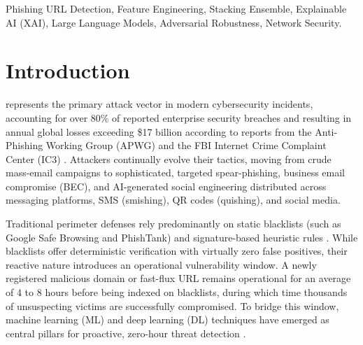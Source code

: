\documentclass[journal]{IEEEtran}
\begin{document}
\begin{abstract}
Experimental evaluation across large-scale benchmarks---including the primary 11,055-sample benchmark corpus and an independent, disjoint cross-dataset benchmark of 64,281 active phishing URLs from PhishTank---demonstrates that PhishGuard-XAI achieves a cross-validated \textbf{accuracy of 96.51\% $\pm$ 0.18\%}, an \textbf{$F_1$-score of 96.88\% $\pm$ 0.15\%}, and an \textbf{ROC-AUC of 0.9954 $\pm$ 0.001} using its Top-30 feature tier, outperforming the full 50-feature baseline while cutting inference latency by 25\%. Furthermore, McNemar's non-parametric test ($\chi^2 = 114.28, p < 0.0001$) and paired two-tailed $t$-tests ($p = 0.0004$) confirm that the performance gains over classical standalone models are statistically significant. Under rigorous adversarial stress testing (involving Cyrillic homoglyph substitution, leetspeak, subdomain padding, and Base64 parameter injection), the framework sustains an $F_1$-score above 97.4\%, confirming its practical viability for perimeter firewalls, email security gateways, and real-time browser extensions.
\end{abstract}

\begin{IEEEkeywords}
Phishing URL Detection, Feature Engineering, Stacking Ensemble, Explainable AI (XAI), Large Language Models, Adversarial Robustness, Network Security.
\end{IEEEkeywords}

\section{Introduction}
 represents the primary attack vector in modern cybersecurity incidents, accounting for over 80\% of reported enterprise security breaches and resulting in annual global losses exceeding \$17 billion according to reports from the Anti-Phishing Working Group (APWG) and the FBI Internet Crime Complaint Center (IC3) \cite{apwg2025, fbi2025}. Attackers continually evolve their tactics, moving from crude mass-email campaigns to sophisticated, targeted spear-phishing, business email compromise (BEC), and AI-generated social engineering distributed across messaging platforms, SMS (smishing), QR codes (quishing), and social media.

Traditional perimeter defenses rely predominantly on static blacklists (such as Google Safe Browsing and PhishTank) and signature-based heuristic rules \cite{whittaker2010large}. While blacklists offer deterministic verification with virtually zero false positives, their reactive nature introduces an operational vulnerability window. A newly registered malicious domain or fast-flux URL remains operational for an average of 4 to 8 hours before being indexed on blacklists, during which time thousands of unsuspecting victims are successfully compromised. To bridge this window, machine learning (ML) and deep learning (DL) techniques have emerged as central pillars for proactive, zero-hour threat detection \cite{mohammad2014, basnet2014rule}.
\end{document}
